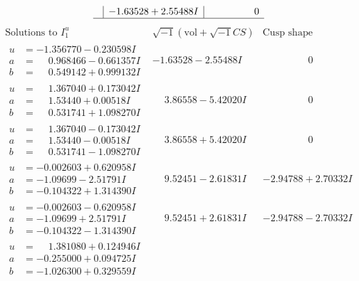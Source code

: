 \documentclass[1p]{elsarticle_modified}
\theoremstyle{definition}
\newcommand{\I}{\sqrt{-1}}
\begin{document}
$$\begin{array}{c|c|c}
 & -1.63528 + 2.55488 I & \phantom{-0.000000 } 0\\
 \hline 
 \end{array}$$\newpage$$\begin{array}{c|c|c}  
\text{Solutions to }I^u_{1}& \I (\text{vol} + \sqrt{-1}CS) & \text{Cusp shape}\\
 \hline 
\begin{aligned}
u &= -1.356770 - 0.230598 I \\
a &= \phantom{-}0.968466 - 0.661357 I \\
b &= \phantom{-}0.549142 + 0.999132 I\end{aligned}
 & -1.63528 - 2.55488 I & \phantom{-0.000000 } 0 \\ \hline\begin{aligned}
u &= \phantom{-}1.367040 + 0.173042 I \\
a &= \phantom{-}1.53440 + 0.00518 I \\
b &= \phantom{-}0.531741 + 1.098270 I\end{aligned}
 & \phantom{-}3.86558 - 5.42020 I & \phantom{-0.000000 } 0 \\ \hline\begin{aligned}
u &= \phantom{-}1.367040 - 0.173042 I \\
a &= \phantom{-}1.53440 - 0.00518 I \\
b &= \phantom{-}0.531741 - 1.098270 I\end{aligned}
 & \phantom{-}3.86558 + 5.42020 I & \phantom{-0.000000 } 0 \\ \hline\begin{aligned}
u &= -0.002603 + 0.620958 I \\
a &= -1.09699 - 2.51791 I \\
b &= -0.104322 + 1.314390 I\end{aligned}
 & \phantom{-}9.52451 - 2.61831 I & -2.94788 + 2.70332 I \\ \hline\begin{aligned}
u &= -0.002603 - 0.620958 I \\
a &= -1.09699 + 2.51791 I \\
b &= -0.104322 - 1.314390 I\end{aligned}
 & \phantom{-}9.52451 + 2.61831 I & -2.94788 - 2.70332 I \\ \hline\begin{aligned}
u &= \phantom{-}1.381080 + 0.124946 I \\
a &= -0.255000 + 0.094725 I \\
b &= -1.026300 + 0.329559 I\end{aligned}

\end{array}$$
\end{document}
